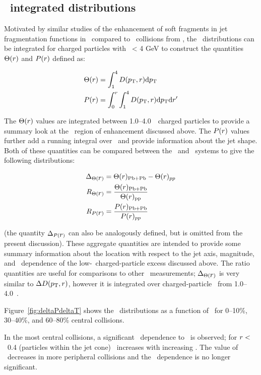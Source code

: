 \subsection{\pt\ integrated distributions}
\label{sec:discussion_int}
Motivated by similar studies of the enhancement of soft fragments in 
jet fragmentation functions in \pbpb\ compared to \pp\ collisions from \cite{PhysRevC.98.024908}, the \Dptr\ distributions can be integrated for charged particles with \pt\ < 4 GeV to construct the quantities $\Theta(\mbox{$r$})$ and $P(\mbox{$r$})$ defined as:

\begin{align}
   \Theta(\mbox{$r$}) &= \int_1^{4} \mbox{$D( \mbox{$p_{\mathrm{T}}$}, r)$}  \mathrm{d} \mbox{$p_{\mathrm{T}}$} \\
   P(\mbox{$r$}) &= \int_0^r \int_1^{4} \mbox{$D( \mbox{$p_{\mathrm{T}}$}, r)$} \mathrm{d} \mbox{$p_{\mathrm{T}}$} \mathrm{d} r'
\end{align}

The $\Theta(\mbox{$r$})$ values are integrated between 1.0--4.0~\GeV\ charged particles to provide a summary look at
the \pt\ region of enhancement discussed above.
 The $P(\mbox{$r$})$ values further add a running integral over \rvar\
and provide information about the jet shape.
Both of these quantities can be compared between the \pp\ and \pbpb\ systems to give the following distributions:

\begin{align}
   \Delta_{\Theta(\mbox{$r$})} &= \Theta(\mbox{$r$})_{\mathrm{Pb+Pb}} - \Theta(\mbox{$r$})_{pp} \\
   R_{\Theta(\mbox{$r$})} &= \frac{\Theta(\mbox{$r$})_{\mathrm{Pb+Pb}}}{\Theta(\mbox{$r$})_{\mathrm{pp}}} \\
   R_{P(\mbox{$r$})} &= \frac{P(\mbox{$r$})_{\mathrm{Pb+Pb}}}{P(\mbox{$r$})_{pp}}
\end{align}

(the quantity $\Delta_{P(\mbox{$r$})}$ can also be analogously defined, but is omitted from the present discussion).
These aggregate quantities are intended to provide some summary information about the location with respect to the 
jet axis, magnitude, and \ptjet\ dependence of the low-\pt\ charged-particle excess discussed above.
The ratio quantities are useful for comparisons to other \pbpb\ measurements; $\Delta_{\Theta(\mbox{$r$})}$ is very similar 
to $\mbox{$\Delta\mbox{$D( \mbox{$p_{\mathrm{T}}$}, r)$}$}$, however it is integrated over charged-particle \pt\ from 1.0--4.0~\GeV.

Figure~\ref{fig:deltaPdeltaT} shows the \DeltaTheta\ distributions as a function of \rvar\ for 0--10\%, 30--40\%,
and 60--80\% central collisions.

In the most central collisions, a significant \ptjet\ dependence to \DeltaTheta\ is observed; for $\mbox{$r$} <$~0.4 (particles
within the jet cone) \DeltaTheta\ increases with increasing \ptjet.
The value of \DeltaTheta\ decreases in more peripheral collisions and the \ptjet\ dependence is no longer significant.

